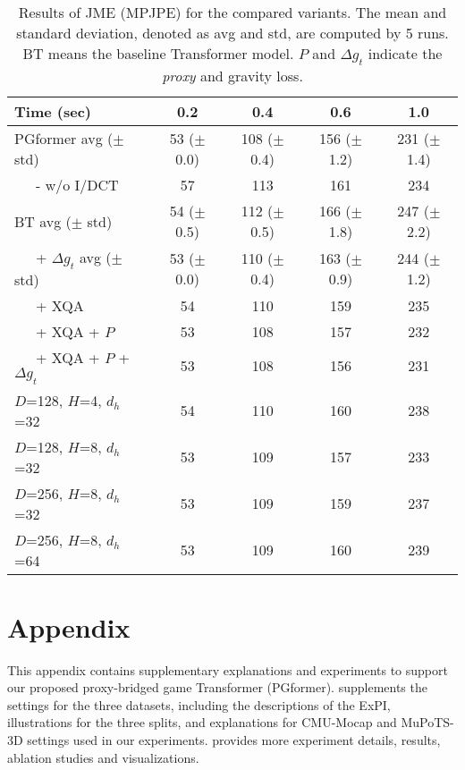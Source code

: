 \documentclass[10pt,twocolumn,letterpaper]{article}
\begin{document}
\begin{table}[t]
    \setlength\tabcolsep{2.8pt}
\caption{Results of JME (MPJPE) for the compared variants. 
    The mean and standard deviation, denoted as avg and std, are computed by 5 runs. 
    BT means the baseline Transformer model. 
    $P$ and $\Delta g_t$ indicate the \textit{proxy} and gravity loss. }
    \vskip -0.2in
    \label{tab:ablation}
    \begin{center}
    \footnotesize
\begin{tabular}{l|cccc}
        \hline
        Time (sec) & 0.2 & 0.4 & 0.6 & 1.0 \\
        \hline
        PGformer avg ($\pm$ std) & 53 ($\pm$ 0.0) & 108 ($\pm$ 0.4) & 156 ($\pm$ 1.2) & 231 ($\pm$ 1.4) \\
        ~~~- w/o I/DCT & 57 & 113 & 161 & 234 \\
        \hline
        BT avg ($\pm$ std) & 54 ($\pm$ 0.5) & 112 ($\pm$ 0.5) & 166 ($\pm$ 1.8) & 247 ($\pm$ 2.2) \\
        ~~~+ $\Delta g_t$ avg ($\pm$ std) & 53 ($\pm$ 0.0) & 110 ($\pm$ 0.4) & 163 ($\pm$ 0.9) & 244 ($\pm$ 1.2) \\
        ~~~+ XQA & 54 & 110 & 159 & 235 \\
        ~~~+ XQA + $P$ & 53 & 108 & 157 & 232 \\
        ~~~+ XQA + $P$ + $\Delta g_t$ & 53 & 108 & 156 & 231 \\ 
        \hline
        $D$=128, $H$=4, $d_h$=32 & 54 & 110 & 160 & 238 \\
        $D$=128, $H$=8, $d_h$=32 & 53 & 109 & 157 & 233 \\
        $D$=256, $H$=8, $d_h$=32 & 53 & 109 & 159 & 237 \\
        $D$=256, $H$=8, $d_h$=64 & 53 & 109 & 160 & 239 \\
        \hline
    \end{tabular}
    \end{center}
    \vskip -0.3in
\end{table}
\clearpage
{\small


}



\clearpage
\appendix
\section*{Appendix}
This appendix contains supplementary explanations and experiments to support our proposed proxy-bridged game Transformer (PGformer).
 supplements the settings for the three datasets, including the descriptions of the ExPI, illustrations for the three splits, and explanations for CMU-Mocap and MuPoTS-3D settings used in our experiments. 
 provides more experiment details, results, ablation studies and visualizations. 
\end{document}
